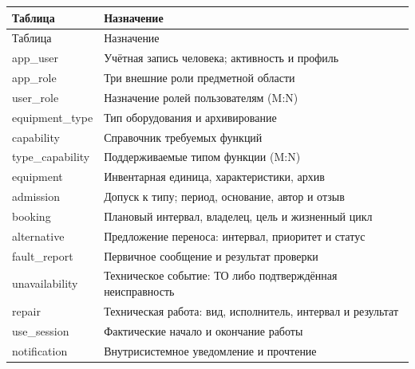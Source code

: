 \begin{singlespace}\small
\begin{longtable}{>{\raggedright\arraybackslash}p{}>{\raggedright\arraybackslash}p{}}
\toprule Таблица & Назначение\\\midrule\endfirsthead
\toprule Таблица & Назначение\\\midrule\endhead
app\_\allowbreak{}user & Учётная запись человека; активность и профиль \\
app\_\allowbreak{}role & Три внешние роли предметной области \\
user\_\allowbreak{}role & Назначение ролей пользователям (M:N) \\
equipment\_\allowbreak{}type & Тип оборудования и архивирование \\
capability & Справочник требуемых функций \\
type\_\allowbreak{}capability & Поддерживаемые типом функции (M:N) \\
equipment & Инвентарная единица, характеристики, архив \\
admission & Допуск к типу; период, основание, автор и отзыв \\
booking & Плановый интервал, владелец, цель и жизненный цикл \\
alternative & Предложение переноса: интервал, приоритет и статус \\
fault\_\allowbreak{}report & Первичное сообщение и результат проверки \\
unavailability & Техническое событие: ТО либо подтверждённая неисправность \\
repair & Техническая работа: вид, исполнитель, интервал и результат \\
use\_\allowbreak{}session & Фактические начало и окончание работы \\
notification & Внутрисистемное уведомление и прочтение \\
\bottomrule\end{longtable}\end{singlespace}